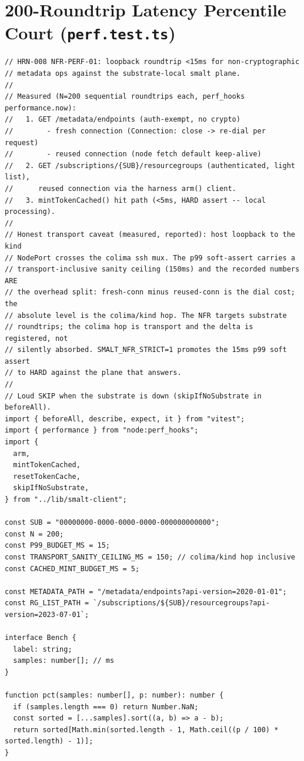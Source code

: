 \documentclass[10pt,twoside,openany]{book}
\theoremstyle{plain}
\theoremstyle{definition}
\theoremstyle{remark}
\begin{document}
\section{200-Roundtrip Latency Percentile Court (\texttt{perf.test.ts})}
\begin{lstlisting}[caption={apps/web/test/harness/nfr/perf.test.ts}]
// HRN-008 NFR-PERF-01: loopback roundtrip <15ms for non-cryptographic
// metadata ops against the substrate-local smalt plane.
//
// Measured (N=200 sequential roundtrips each, perf_hooks performance.now):
//   1. GET /metadata/endpoints (auth-exempt, no crypto)
//        - fresh connection (Connection: close -> re-dial per request)
//        - reused connection (node fetch default keep-alive)
//   2. GET /subscriptions/{SUB}/resourcegroups (authenticated, light list),
//      reused connection via the harness arm() client.
//   3. mintTokenCached() hit path (<5ms, HARD assert -- local processing).
//
// Honest transport caveat (measured, reported): host loopback to the kind
// NodePort crosses the colima ssh mux. The p99 soft-assert carries a
// transport-inclusive sanity ceiling (150ms) and the recorded numbers ARE
// the overhead split: fresh-conn minus reused-conn is the dial cost; the
// absolute level is the colima/kind hop. The NFR targets substrate
// roundtrips; the colima hop is transport and the delta is registered, not
// silently absorbed. SMALT_NFR_STRICT=1 promotes the 15ms p99 soft assert
// to HARD against the plane that answers.
//
// Loud SKIP when the substrate is down (skipIfNoSubstrate in beforeAll).
import { beforeAll, describe, expect, it } from "vitest";
import { performance } from "node:perf_hooks";
import {
  arm,
  mintTokenCached,
  resetTokenCache,
  skipIfNoSubstrate,
} from "../lib/smalt-client";

const SUB = "00000000-0000-0000-0000-000000000000";
const N = 200;
const P99_BUDGET_MS = 15;
const TRANSPORT_SANITY_CEILING_MS = 150; // colima/kind hop inclusive
const CACHED_MINT_BUDGET_MS = 5;

const METADATA_PATH = "/metadata/endpoints?api-version=2020-01-01";
const RG_LIST_PATH = `/subscriptions/${SUB}/resourcegroups?api-version=2023-07-01`;

interface Bench {
  label: string;
  samples: number[]; // ms
}

function pct(samples: number[], p: number): number {
  if (samples.length === 0) return Number.NaN;
  const sorted = [...samples].sort((a, b) => a - b);
  return sorted[Math.min(sorted.length - 1, Math.ceil((p / 100) * sorted.length) - 1)];
}


\end{lstlisting}
\end{document}
